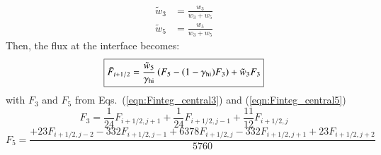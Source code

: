 \documentclass{warpdoc}
\newcommand\frameeqn[1]{\fbox{$\displaystyle #1$}}
\begin{document}
%
\begin{align}
\tilde{w}_3&=\frac{w_3}{w_3+w_5} \\
\tilde{w}_5&=\frac{w_5}{w_3+w_5}
\end{align}
%
Then, the flux at the interface becomes:
%
\begin{equation}
\frameeqn{
\bar{F}_{i+1/2}=\frac{\tilde{w}_5}{\gamma_{\rm hi}} \left( F_5 - (1-\gamma_{\rm hi}) F_3 \right)+ \tilde{w}_3 F_3
}
\end{equation}
%
with $F_3$ and $F_5$ from Eqs.\ (\ref{eqn:Finteg_central3}) and (\ref{eqn:Finteg_central5})
%
\begin{equation}
F_3=\frac{1}{24} F_{i+1/2,j+1}+ \frac{1}{24}F_{i+1/2,j-1}   + \frac{11}{12}F_{i+1/2,j} 
\end{equation}
%
%
\begin{equation}
F_5=  \frac{+23 F_{i+1/2,j-2} -332 F_{i+1/2,j-1}+ 6378 F_{i+1/2,j} - 332 F_{i+1/2,j+1} + 23 F_{i+1/2,j+2}}{5760}
\end{equation}
%

\appendix


  
  
\end{document}

